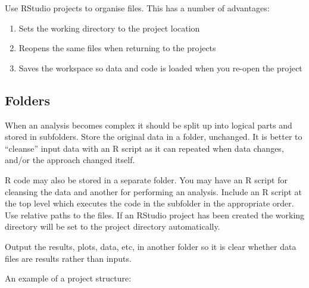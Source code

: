 \documentclass[]{book}
\providecommand{\tightlist}{%
  \setlength{\itemsep}{0pt}\setlength{\parskip}{0pt}}
\begin{document}
Use RStudio projects to organise files. This has a number of advantages:

\begin{enumerate}
\def\labelenumi{\arabic{enumi}.}
\tightlist
\item
  Sets the working directory to the project location
\item
  Reopens the same files when returning to the projects
\item
  Saves the workspace so data and code is loaded when you re-open the project
\end{enumerate}

\hypertarget{folders}{%
\subsection{Folders}\label{folders}}

When an analysis becomes complex it should be split up into logical parts and stored in
subfolders. Store the original data in a folder, unchanged. It is better to ``cleanse'' input
data with an R script as it can repeated when data changes, and/or the approach changed
itself.

R code may also be stored in a separate folder. You may have an R script for cleansing the
data and another for performing an analysis. Include an R script at the top level which
executes the code in the subfolder in the appropriate order. Use relative paths to the
files. If an RStudio project has been created the working directory will be set to the
project directory automatically.

Output the results, plots, data, etc, in another folder so it is clear whether data files
are results rather than inputs.

An example of a project structure:
\end{document}
